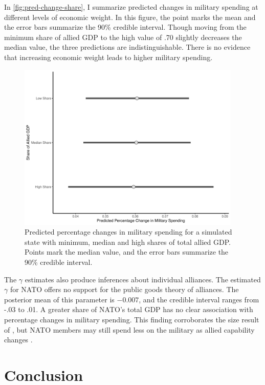 \documentclass[12pt]{article}
\begin{document}
In \autoref{fig:pred-change-share}, I summarize predicted changes in military spending at different levels of economic weight. 
In this figure, the point marks the mean and the error bars summarize the 90\% credible interval. 
Though moving from the minimum share of allied GDP to the high value of .70 slightly decreases the median value, the three predictions are indistinguishable. 
There is no evidence that increasing economic weight leads to higher military spending. 

\begin{figure}[htbp]
	\centering
		\includegraphics[width=0.95\textwidth]{pred-change-share.pdf}
	\caption{Predicted percentage changes in military spending for a simulated state with minimum, median and high shares of total allied GDP. Points mark the median value, and the error bars summarize the 90\% credible interval.}
	\label{fig:pred-change-share}
\end{figure}


The $\gamma$ estimates also produce inferences about individual alliances.
The estimated $\gamma$ for NATO offers no support for the public goods theory of alliances. 
The posterior mean of this parameter is $-0.007$, and the credible interval ranges from -.03 to .01.  
A greater share of NATO's total GDP has no clear association with percentage changes in military spending. 
This finding corroborates the size result of \citet{PluemperNeumayer2015}, but NATO members may still spend less on the military as allied capability changes \citep{GeorgeSandler2017}.


\section{Conclusion}
\end{document}

